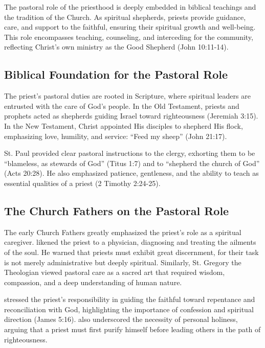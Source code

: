 \documentclass[12pt, doc]{apa7}   	%
\begin{document}
The pastoral role of the priesthood is deeply embedded in biblical teachings and the tradition of the Church. As spiritual shepherds, priests provide guidance, care, and support to the faithful, ensuring their spiritual growth and well-being. This role encompasses teaching, counseling, and interceding for the community, reflecting Christ’s own ministry as the Good Shepherd (John 10:11-14).

\subsection{Biblical Foundation for the Pastoral Role}

The priest’s pastoral duties are rooted in Scripture, where spiritual leaders are entrusted with the care of God’s people. In the Old Testament, priests and prophets acted as shepherds guiding Israel toward righteousness (Jeremiah 3:15). In the New Testament, Christ appointed His disciples to shepherd His flock, emphasizing love, humility, and service: ``Feed my sheep'' (John 21:17).

St. Paul provided clear pastoral instructions to the clergy, exhorting them to be ``blameless, as stewards of God'' (Titus 1:7) and to ``shepherd the church of God'' (Acts 20:28). He also emphasized patience, gentleness, and the ability to teach as essential qualities of a priest (2 Timothy 2:24-25).

\subsection{The Church Fathers on the Pastoral Role}

The early Church Fathers greatly emphasized the priest’s role as a spiritual caregiver. \citet{priesthood_chrysostom,complete_work_chrysostom} likened the priest to a physician, diagnosing and treating the ailments of the soul. He warned that priests must exhibit great discernment, for their task is not merely administrative but deeply spiritual. Similarly, St. Gregory the Theologian \citep{early_church_akin} viewed pastoral care as a sacred art that required wisdom, compassion, and a deep understanding of human nature.

\citet{priesthood_shenouda} stressed the priest’s responsibility in guiding the faithful toward repentance and reconciliation with God, highlighting the importance of confession and spiritual direction (James 5:16). \citet{st_basil_letters} also underscored the necessity of personal holiness, arguing that a priest must first purify himself before leading others in the path of righteousness.
\end{document}
